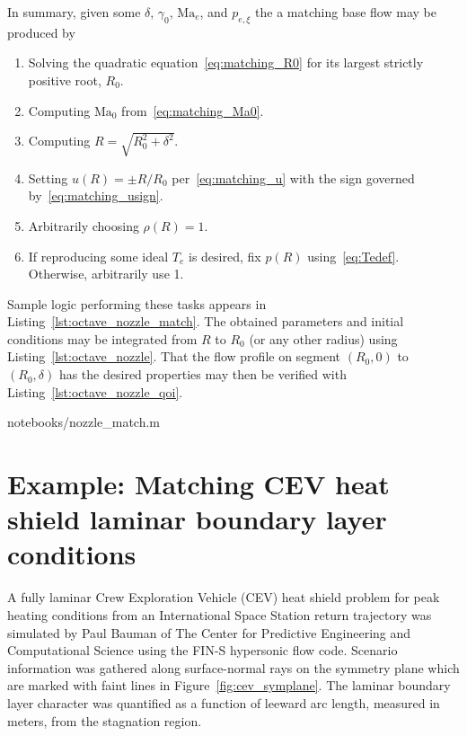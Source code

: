 \documentclass[letterpaper,11pt,nointlimits,reqno]{amsart}
\newcommand{\Mach}[1][]{\mbox{Ma}_{#1}}
\begin{document}
In summary, given some $\delta$, $\gamma_0$, $\Mach[e]$, and $p_{e,\xi}$ the
a matching base flow may be produced by
\begin{enumerate}
    \item Solving the quadratic equation~\eqref{eq:matching_R0} for 
        its largest strictly positive root, $R_0$.
    \item Computing $\Mach[0]{}$ from~\eqref{eq:matching_Ma0}.
    \item Computing $R = \sqrt{R_0^2 + \delta^2}$.
    \item Setting $u\!\left(R\right)=\pm R / R_0$ per~\eqref{eq:matching_u}
        with the sign governed by~\eqref{eq:matching_usign}.
    \item Arbitrarily choosing $\rho\!\left(R\right) = 1$.
    \item If reproducing some ideal $T_e$ is desired,
        fix $p\!\left(R\right)$ using~\eqref{eq:Tedef}.
        Otherwise, arbitrarily use 1.
\end{enumerate}
Sample logic performing these tasks appears in
Listing~\ref{lst:octave_nozzle_match}. The obtained parameters and initial
conditions may be integrated from $R$ to $R_0$ (or any other radius) using
Listing~\ref{lst:octave_nozzle}. That the flow profile on segment $\left( R_0,
0 \right)$ to $\left( R_0, \delta \right)$ has the desired properties may then
be verified with Listing~\ref{lst:octave_nozzle_qoi}.


                {notebooks/nozzle_match.m}

\section{Example: Matching CEV heat shield laminar boundary layer conditions}

A fully laminar Crew Exploration Vehicle (CEV) heat shield problem for peak
heating conditions from an International Space Station return trajectory was
simulated by Paul Bauman of The Center for Predictive Engineering and
Computational Science using the FIN-S hypersonic flow
code\citep{KirkModeling2013}.  Scenario information was gathered along
surface-normal rays on the symmetry plane which are marked with faint lines in
Figure~\ref{fig:cev_symplane}.  The laminar boundary layer character was
quantified as a function of leeward arc length, measured in meters, from the
stagnation region.
\end{document}
